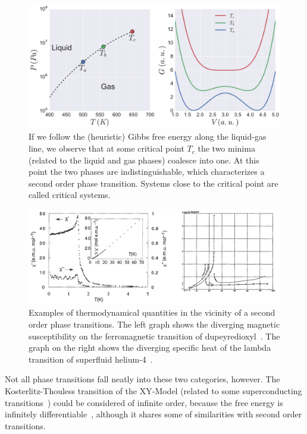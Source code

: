 \begin{figure}
\begin{center}
    \includegraphics[scale=0.4]{chapters/ch2-crit/figs/gibbs2}
\end{center}
\caption{If we follow the (heuristic) Gibbs free energy along the liquid-gas
    line, we observe that at some critical point $T_c$ the two minima (related
    to the liquid and gas phases) coalesce into one. At this point the two
    phases are indistinguishable, which characterizes a second order phase
    transition. Systems close to the critical point are called critical
    systems.}
\label{fig:gibbs2}
\end{figure}


\begin{figure}
\begin{center}
    \includegraphics[scale=0.16]{chapters/ch2-crit/figs/suscep}
\end{center}
\caption{Examples of thermodynamical quantities in the vicinity of a second
    order phase transitions. The left graph shows the diverging magnetic
    susceptibility on the ferromagnetic transition of
    dupeyredioxyl~\cite{Chiarelli1993}. The graph on the right shows the
    diverging specific heat of the lambda transition of superfluid
    helium-4~\cite{Keesom1935}.}
\label{fig:suscep}
\end{figure}

Not all phase transitions fall neatly into these two categories, however. The
Kosterlitz-Thouless transition of the XY-Model (related to some superconducting
transitions~\cite{Resnick1981}) could be considered of infinite order, because
the free energy is infinitely differentiable~\cite{Kosterlitz1973}, although it
shares some of similarities with second order transitions.

